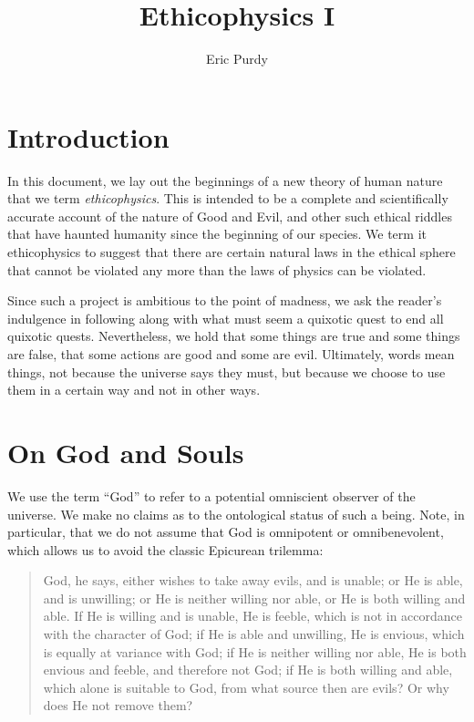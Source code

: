 \documentclass{article}
\title{Ethicophysics I}
\author{Eric Purdy}
\begin{document}
\maketitle

\begin{abstract}
\end{abstract}

\section{Introduction}

In this document, we lay out the beginnings of a new theory of human
nature that we term {\em ethicophysics}. This is intended to be a
complete and scientifically accurate account of the nature of Good and
Evil, and other such ethical riddles that have haunted humanity since
the beginning of our species. We term it ethicophysics to suggest that
there are certain natural laws in the ethical sphere that cannot be
violated any more than the laws of physics can be violated.

Since such a project is ambitious to the point of madness, we ask the
reader's indulgence in following along with what must seem a quixotic
quest to end all quixotic quests. Nevertheless, we hold that some
things are true and some things are false, that some actions are good
and some are evil. Ultimately, words mean things, not because the
universe says they must, but because we choose to use them in a
certain way and not in other ways.

\section{On God and Souls}

We use the term ``God'' to refer to a potential omniscient observer of
the universe. We make no claims as to the ontological status of such a
being. Note, in particular, that we do not assume that God is
omnipotent or omnibenevolent, which allows us to avoid the classic
Epicurean trilemma:

\begin{quote}
  God, he says, either wishes to take away evils, and is unable; or He
  is able, and is unwilling; or He is neither willing nor able, or He
  is both willing and able. If He is willing and is unable, He is
  feeble, which is not in accordance with the character of God; if He
  is able and unwilling, He is envious, which is equally at variance
  with God; if He is neither willing nor able, He is both envious and
  feeble, and therefore not God; if He is both willing and able, which
  alone is suitable to God, from what source then are evils? Or why
  does He not remove them?\cite{trilemma}
\end{quote}
\end{document}
